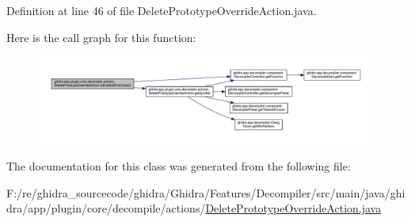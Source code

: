 Definition at line 46 of file Delete\+Prototype\+Override\+Action.\+java.

Here is the call graph for this function\+:
\nopagebreak
\begin{figure}[H]
\begin{center}
\leavevmode
\includegraphics[width=350pt]{classghidra_1_1app_1_1plugin_1_1core_1_1decompile_1_1actions_1_1_delete_prototype_override_action_a1ded5df0bab8251adaf5d6e19e5adedb_cgraph}
\end{center}
\end{figure}


The documentation for this class was generated from the following file\+:\begin{DoxyCompactItemize}
\item 
F\+:/re/ghidra\+\_\+sourcecode/ghidra/\+Ghidra/\+Features/\+Decompiler/src/main/java/ghidra/app/plugin/core/decompile/actions/\mbox{\hyperlink{_delete_prototype_override_action_8java}{Delete\+Prototype\+Override\+Action.\+java}}\end{DoxyCompactItemize}
